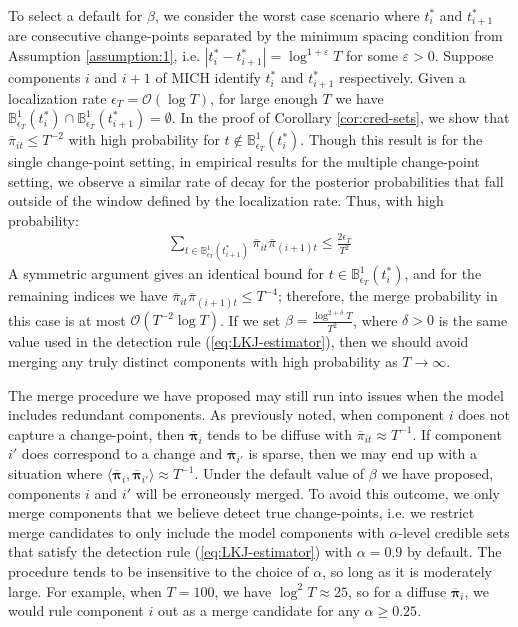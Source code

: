 To select a default for $\beta$, we consider the worst case scenario where $t^*_i$ and $t^*_{i+1}$ are consecutive change-points separated by the minimum spacing condition from Assumption \ref{assumption:1}, i.e. $|t^*_i - t^*_{i+1}| = \log^{1+\varepsilon} T$ for some $\varepsilon > 0$. Suppose components $i$ and $i+1$ of MICH identify $t^*_i$ and $t^*_{i+1}$ respectively. Given a localization rate $\epsilon_T = \mathcal{O}(\log T)$, for large enough $T$ we have $\mathbb{B}_{\epsilon_T}^{1}(t^*_i) \cap \mathbb{B}_{\epsilon_T}^{1}(t^*_{i+1}) = \emptyset$. In the proof of Corollary \ref{cor:cred-sets}, we show that $\overline{\pi}_{it} \leq T^{-2}$ with high probability for $t \not\in \mathbb{B}_{\epsilon_T}^{1}(t^*_i)$. Though this result is for the single change-point setting, in empirical results for the multiple change-point setting, we observe a similar rate of decay for the posterior probabilities that fall outside of the window defined by the localization rate. Thus, with high probability:
\begin{align}
    \sum_{t \in \mathbb{B}_{\epsilon_T}^{1}(t^*_{i+1})} \overline{\pi}_{it} \overline{\pi}_{(i+1)t} \leq \frac{2\epsilon_T}{T^2}
\end{align}
A symmetric argument gives an identical bound for $t \in \mathbb{B}_{\epsilon_T}^{1}(t^*_{i})$, and for the remaining indices we have $\overline{\pi}_{it} \overline{\pi}_{(i+1)t} \leq T^{-4}$; therefore, the merge probability in this case is at most $\mathcal{O}(T^{-2}\log T)$. If we set $\beta = \frac{\log^{2+\delta} T}{T^2}$, where $\delta > 0$ is the same value used in the detection rule (\ref{eq:LKJ-estimator}), then we should avoid merging any truly distinct components with high probability as $T \to \infty$.

The merge procedure we have proposed may still run into issues when the model includes redundant components. As previously noted, when component $i$ does not capture a change-point, then $\overline{\boldsymbol{\pi}}_{i}$ tends to be diffuse with $\overline{\pi}_{it} \approx T^{-1}$. If component $i'$ does correspond to a change and $\overline{\boldsymbol{\pi}}_{i'}$ is sparse, then we may end up with a situation where $\langle\overline{\boldsymbol{\pi}}_{i}, \overline{\boldsymbol{\pi}}_{i'}\rangle \approx T^{-1}$. Under the default value of $\beta$ we have proposed, components $i$ and $i'$ will be erroneously merged. To avoid this outcome, we only merge components that we believe detect true change-points, i.e. we restrict merge candidates to only include the model components with $\alpha$-level credible sets that satisfy the detection rule (\ref{eq:LKJ-estimator}) with $\alpha = 0.9$ by default. The procedure tends to be insensitive to the choice of $\alpha$, so long as it is moderately large. For example, when $T = 100$, we have $\log^2 T \approx 25$, so for a diffuse $\overline{\boldsymbol{\pi}}_i$, we would rule component $i$ out as a merge candidate for any $\alpha \geq 0.25$.
